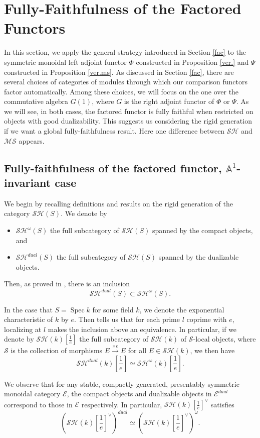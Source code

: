 \documentclass{article}
\theoremstyle{definition}
\newcommand{\on}{\operatorname}
\begin{document}
\section{Fully-Faithfulness of the Factored Functors}
In this section, we apply the general strategy introduced in Section \ref{fac} to the symmetric monoidal left adjoint functor $\Phi$ constructed in Proposition \ref{ver.} and $\Psi$ constructed in Proposition \ref{ver.ms}. As discussed in Section \ref{fac}, there are several choices of categories of modules through which our comparison functors factor automatically. Among these choices, we will focus on the one over the commutative algebra $G(1)$, where $G$ is the right adjoint functor of $\Phi$ or $\Psi$. As we will see, in both cases, the factored functor is fully faithful when restricted on objects with good dualizability. This suggests us considering the rigid generation if we want a global fully-faithfulness result. Here one difference between $\mathcal{SH}$ and $\mathcal{MS}$ appears.
\subsection{Fully-faithfulness of the factored functor, $\mathbb{A}^1$-invariant case}
We begin by recalling definitions and results on the rigid generation of the category $\mathcal{SH}(S)$. We denote by
\begin{itemize}
\item $\mathcal{SH}^\omega(S)$ the full subcategory of $\mathcal{SH}(S)$ spanned by the compact objects, and
\item $\mathcal{SH}^{dual}(S)$ the full subcategory of $\mathcal{SH}(S)$ spanned by the dualizable objects.
\end{itemize}
Then, as proved in \cite{Rio}, there is an inclusion
\[
\mathcal{SH}^{dual}(S)\subset\mathcal{SH}^\omega(S).\]


In the case that $S=\on{Spec} k$ for some field $k$, we denote the exponential characteristic of $k$ by $e$. Then \cite[Corollary B.2]{LYZ+} tells us that for each prime $l$ coprime with $e$, localizing at $l$ makes the inclusion above an equivalence. In particular, if we denote by $\mathcal{SH}(k)[\frac{1}{e}]$ the full subcategory of $\mathcal{SH}(k)$ of $\mathcal{S}$-local objects, where $\mathcal{S}$ is the collection of morphisms $E\xrightarrow{\times e}E$ for all $E\in\mathcal{SH}(k)$, we then have\[
\mathcal{SH}^{dual}(k)[\frac{1}{e}]\simeq\mathcal{SH}^\omega(k)[\frac{1}{e}].\]


We observe that for any stable, compactly generated, presentably symmetric monoidal category $\mathcal{E}$, the compact objects and dualizable objects in $\mathcal{E}^{dual}$ correspond to those in $\mathcal{E}$ respectively. In particular, $\mathcal{SH}(k)[\frac{1}{e}]^\vee$ satisfies
\[(\mathcal{SH}(k)[\frac{1}{e}]^{\vee})^{dual}\simeq (\mathcal{SH}(k)[\frac{1}{e}]^{\vee})^\omega.\]
\end{document}
